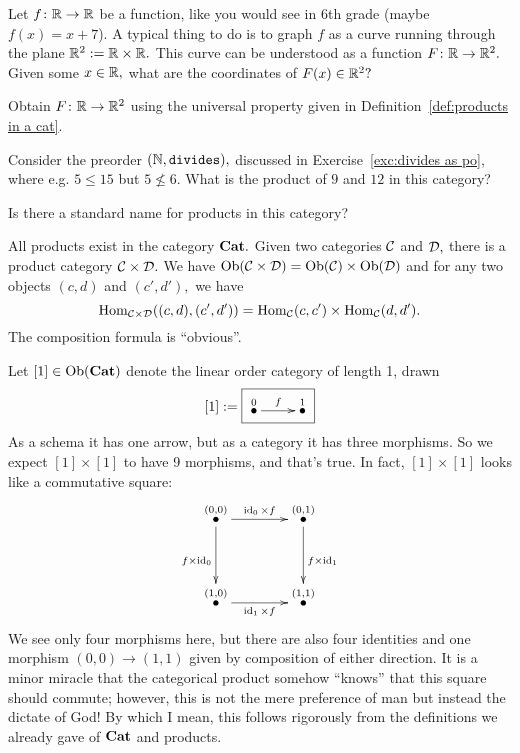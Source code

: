 \documentclass[../main/CT4S-EN-RU]{subfiles}
\begin{document}
\begin{exerciseRUS}
\end{exerciseRUS}

\begin{exerciseENG}
Let $f\colon{\mathbb R}\rightarrow{\mathbb R}$ be a function, like you would see in 6th grade (maybe $f(x)=x+7$). A typical thing to do is to graph $f$ as a curve running through the plane ${\mathbb R}^2:={\mathbb R}\times{\mathbb R}.$ This curve can be understood as a function $F\colon{\mathbb R}\rightarrow{\mathbb R}^2.$
\sexc Given some $x\in{\mathbb R},$ what are the coordinates of $F(x)\in{\mathbb R}^2?$ 
\item Obtain $F\colon{\mathbb R}\rightarrow{\mathbb R}^2$ using the universal property given in Definition~\ref{def:products in a cat}. 
\endsexc
\end{exerciseENG}

\begin{exerciseRUS}
\end{exerciseRUS}

\begin{exerciseENG}
Consider the preorder $({\mathbb N},{\tt divides}),$ discussed in Exercise~\ref{exc:divides as po}, where e.g. $5\leq 15$ but $5\not\leq 6.$ \sexc What is the product of $9$ and $12$ in this category?
\item Is there a standard name for products in this category?
\endsexc
\end{exerciseENG}

\begin{exerciseRUS}
\end{exerciseRUS}

\begin{exampleENG}\label{ex:[1]x[1]}
All products exist in the category ${\mathbf{Cat}}.$ Given two categories $\mathcal{C}$ and $\mathcal{D},$ there is a product category $\mathcal{C}\times\mathcal{D}.$ We have $\operatorname{Ob}(\mathcal{C}\times\mathcal{D})=\operatorname{Ob}(\mathcal{C})\times\operatorname{Ob}(\mathcal{D})$ and for any two objects $(c,d)$ and $(c',d'),$ we have $$\operatorname{Hom}_{\mathcal{C}\times\mathcal{D}}((c,d),(c',d'))=\operatorname{Hom}_\mathcal{C}(c,c')\times\operatorname{Hom}_\mathcal{C}(d,d').$$ The composition formula is “obvious”.

Let $[1]\in\operatorname{Ob}({\mathbf{Cat}})$ denote the linear order category of length 1, drawn $$[1]:=\fbox{\xymatrix{\LMO{0}\ar[r]^f&\LMO{1}}}$$ As a schema it has one arrow, but as a category it has three morphisms. So we expect $[1]\times[1]$ to have 9 morphisms, and that's true. In fact, $[1]\times[1]$ looks like a commutative square:
\begin{align}\label{dia:comm square}
\xymatrix@=40pt{
\LMO{(0,0)}\ar[r]^{\id_0\times f}\ar[d]_{f\times\id_0}&\LMO{(0,1)}\ar[d]^{f\times\id_1}\\
\LMO{(1,0)}\ar[r]_{\id_1\times f}&\LMO{(1,1)}}
\end{align}
We see only four morphisms here, but there are also four identities and one morphism $(0,0)\to(1,1)$ given by composition of either direction. It is a minor miracle that the categorical product somehow “knows” that this square should commute; however, this is not the mere preference of man but instead the dictate of God! By which I mean, this follows rigorously from the definitions we already gave of ${\mathbf{Cat}}$ and products.
\end{exampleENG}
\end{document}
